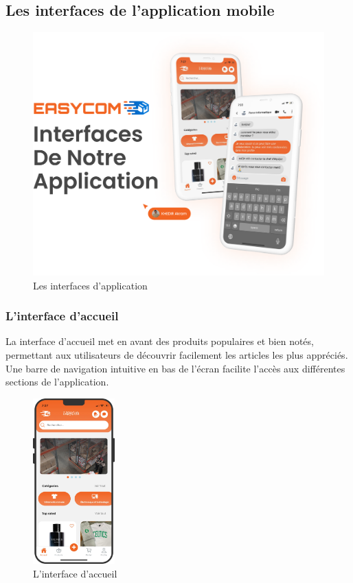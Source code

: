 \documentclass[edit,12pt,a4paper,ChapStyle,oneside,doubleinterligne]{report}
\begin{document}
\subsection{Les interfaces de l'application mobile}
\begin{figure} [H]
    \centering
    \includegraphics[width=1\textwidth]{images/application.png}
    \caption{Les interfaces d'application}
    \label{fig:app}
\end{figure}
\subsubsection{L'interface d’accueil}
La interface d'accueil met en avant des produits populaires et bien notés, permettant aux utilisateurs de découvrir facilement les articles les plus appréciés. Une barre de navigation intuitive en bas de l'écran facilite l'accès aux différentes sections de l'application.
  \begin{figure} [H]
    \centering
    \includegraphics[width=0.28\textwidth]{images/app home.png}
    \caption{L'interface d'accueil}
    \label{fig:colors}
\end{figure}
\end{document}
